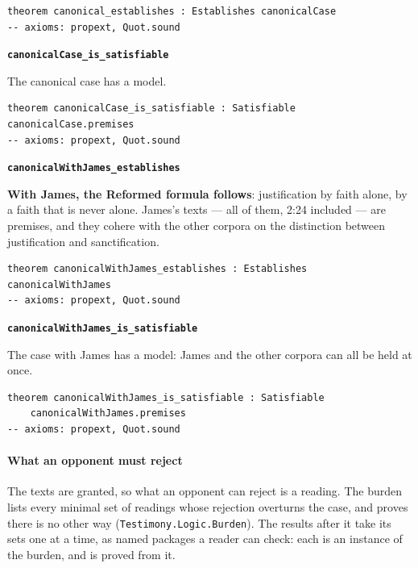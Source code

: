 \documentclass[11pt]{article}
\begin{document}
{\small\begin{verbatim}
theorem canonical_establishes : Establishes canonicalCase
-- axioms: propext, Quot.sound
\end{verbatim}}
\par\medskip\noindent\textbf{\texttt{canonical\allowbreak{}Case\_\allowbreak{}is\_\allowbreak{}satisfiable}}\par\nobreak\noindent
The canonical case has a model.

{\small\begin{verbatim}
theorem canonicalCase_is_satisfiable : Satisfiable canonicalCase.premises
-- axioms: propext, Quot.sound
\end{verbatim}}
\par\medskip\noindent\textbf{\texttt{canonical\allowbreak{}With\allowbreak{}James\_\allowbreak{}establishes}}\par\nobreak\noindent
\textbf{With James, the Reformed formula follows}: justification by faith alone, by a faith that is never alone. James's texts — all of them, 2:24 included — are premises, and they cohere with the other corpora on the distinction between justification and sanctification.

{\small\begin{verbatim}
theorem canonicalWithJames_establishes : Establishes canonicalWithJames
-- axioms: propext, Quot.sound
\end{verbatim}}
\par\medskip\noindent\textbf{\texttt{canonical\allowbreak{}With\allowbreak{}James\_\allowbreak{}is\_\allowbreak{}satisfiable}}\par\nobreak\noindent
The case with James has a model: James and the other corpora can all be held at once.

{\small\begin{verbatim}
theorem canonicalWithJames_is_satisfiable : Satisfiable
    canonicalWithJames.premises
-- axioms: propext, Quot.sound
\end{verbatim}}
\paragraph*{What an opponent must reject}
\leavevmode\par
The texts are granted, so what an opponent can reject is a reading. The burden lists every minimal set of readings whose rejection overturns the case, and proves there is no other way (\texttt{Testimony.Logic.Burden}). The results after it take its sets one at a time, as named packages a reader can check: each is an instance of the burden, and is proved from it.
\end{document}
